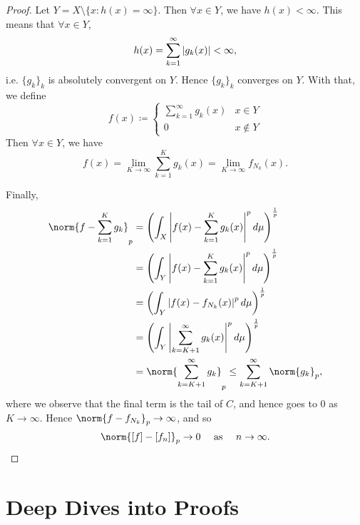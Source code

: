 \documentclass[notoc,notitlepage]{tufte-book}
\begin{document}
\begin{proof}
  Let $Y = X \setminus \{ x : h(x) = \infty \}$.
  Then $\forall x \in Y$, we have $h(x) < \infty$.
  This means that $\forall x \in Y$,
  \begin{equation*}
    h(x) = \sum_{k=1}^{\infty} \left|g_k(x)\right| < \infty,
  \end{equation*}
  i.e. $\{ g_k \}_k$ is absolutely convergent on $Y$.
  Hence $\{ g_k \}_k$ converges on $Y$.
  With that, we define
  \begin{equation*}
    f(x) \coloneqq \begin{cases}
      \sum_{k=1}^{\infty} g_k(x) & x \in Y \\
      0                          & x \notin Y
    \end{cases}
  \end{equation*}
  Then $\forall x \in Y$,  we have
  \begin{equation*}
    f(x) = \lim_{K \to \infty} \sum_{k=1}^{K} g_k(x)
    = \lim_{K \to \infty} f_{N_k}(x).
  \end{equation*}

  Finally,
  \begin{align*}
    \norm{f - \sum_{k=1}^{K} g_k}_p
    &= \left( \int_{X}
      \abs{f(x) - \sum_{k=1}^{K} g_k(x)}^p \dif{\mu}
    \right)^{\frac{1}{p}} \\
    &= \left( \int_{Y}
      \abs{f(x) - \sum_{k=1}^{K} g_k(x)}^p \dif{\mu}
    \right)^{\frac{1}{p}} \\
    &= \left( \int_{Y} \abs{f(x) - f_{N_k}(x)}^p \dif{\mu} \right)^{\frac{1}{p}} \\
    &= \left( \int_{Y}
      \abs{\sum_{k = K+1}^{\infty} g_k(x)}^p \dif{\mu}
    \right)^{\frac{1}{p}} \\
    &= \norm{ \sum_{k=K+1}^{\infty} g_k }_p
     \leq \sum_{k = K+1}^{\infty} \norm{g_k}_p,
  \end{align*}
  where we observe that the final term is the tail of $C$,
  and hence goes to $0$ as $K \to \infty$.
  Hence $\norm{f - f_{N_k}}_p \to \infty$, and so
  \begin{equation*}
    \norm{[f] - [f_n]}_p \to 0 \quad\text{ as }\quad n \to \infty.
  \end{equation*}
\end{proof}



\appendix

\chapter{Deep Dives into Proofs}%
\label{chp:deep_dives_into_proofs}
\end{document}
